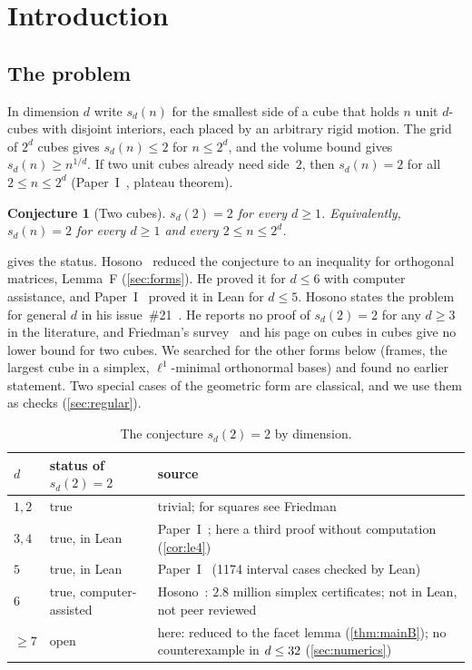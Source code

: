 \documentclass[11pt,a4paper]{article}
\newtheorem{conjecture}[theorem]{Conjecture}
\begin{document}
\tableofcontents

\section{Introduction}\label{sec:intro}

\subsection{The problem}
In dimension $d$ write $s_d(n)$ for the smallest side of a cube that holds $n$ unit $d$-cubes with disjoint interiors, each placed by an arbitrary rigid motion. The grid of $2^d$ cubes gives $s_d(n)\le2$ for $n\le 2^d$, and the volume bound gives $s_d(n)\ge n^{1/d}$. If two unit cubes already need side~$2$, then $s_d(n)=2$ for all $2\le n\le 2^d$ (Paper~I~\cite{cubecentre}, plateau theorem).

\begin{conjecture}[Two cubes]\label{conj:two}
$s_d(2)=2$ for every $d\ge1$. Equivalently, $s_d(n)=2$ for every $d\ge1$ and every $2\le n\le 2^d$.
\end{conjecture}

 gives the status. Hosono~\cite{hosono} reduced the conjecture to an inequality for orthogonal matrices, Lemma~F (\cref{sec:forms}). He proved it for $d\le6$ with computer assistance, and Paper~I~\cite{cubecentre} proved it in Lean for $d\le5$. Hosono states the problem for general $d$ in his issue~\#21~\cite{hosonoissue}. He reports no proof of $s_d(2)=2$ for any $d\ge3$ in the literature, and Friedman's survey~\cite{friedman} and his page on cubes in cubes give no lower bound for two cubes. We searched for the other forms below (frames, the largest cube in a simplex, $\ell^1$-minimal orthonormal bases) and found no earlier statement. Two special cases of the geometric form are classical, and we use them as checks (\cref{sec:regular}).

\begin{table}[t]
\centering\small
\begin{tabularx}{\textwidth}{l l X}
\toprule
$d$ & status of $s_d(2)=2$ & source \\
\midrule
$1,2$ & true & trivial; for squares see Friedman~\cite{friedman} \\
$3,4$ & true, in Lean & Paper~I~\cite{cubecentre}; here a third proof without computation (\cref{cor:le4}) \\
$5$ & true, in Lean & Paper~I~\cite{cubecentre} (1174 interval cases checked by Lean) \\
$6$ & true, computer-assisted & Hosono~\cite{hosono}: $2.8$ million simplex certificates; not in Lean, not peer reviewed \\
$\ge7$ & open & here: reduced to the facet lemma (\cref{thm:mainB}); no counterexample in $d\le32$ (\cref{sec:numerics}) \\
\bottomrule
\end{tabularx}
\caption{The conjecture $s_d(2)=2$ by dimension.}
\label{tab:status}
\end{table}
\end{document}
